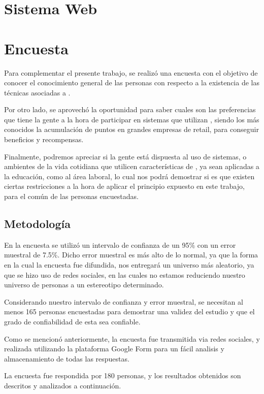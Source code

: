 \section{Sistema Web}


\section{Encuesta}

Para complementar el presente trabajo, se realizó una encuesta con el objetivo de
conocer el conocimiento general de las personas con respecto a la existencia
de las técnicas asociadas a {\GAM}.

Por otro lado, se aprovechó la oportunidad para saber cuales son las preferencias
que tiene la gente a la hora de participar en sistemas que utilizan {\GAM},
siendo los más conocidos la acumulación de puntos en grandes empresas de retail,
para conseguir beneficios y recompensas.

Finalmente, podremos apreciar si la gente está dispuesta al uso de sistemas,
o ambientes de la vida cotidiana que utilicen características de {\GAM},
ya sean aplicadas a la educación, como al área laboral, lo cual nos podrá
demostrar si es que existen ciertas restricciones a la hora de aplicar
el principio expuesto en este trabajo, para el común de las personas
encuestadas.

\subsection{Metodología}

En la encuesta se utilizó un intervalo de confianza de un 95\% con un error
muestral de 7.5\%. Dicho error muestral es más alto de lo normal, ya que la forma
en la cual la encuesta fue difundida, nos entregará un universo más aleatorio,
 ya que se hizo uso de redes sociales, en las cuales no estamos reduciendo nuestro
 universo de personas a un estereotipo determinado.

Considerando nuestro intervalo de confianza y error muestral, se necesitan al menos 165
personas encuestadas para demostrar una validez del estudio y que el grado de confiabilidad
de esta sea confiable.

Como se mencionó anteriormente, la encuesta fue transmitida via redes sociales,
y realizada utilizando la plataforma Google Form para un fácil analisis y almacenamiento
 de todas las respuestas.

La encuesta fue respondida por 180 personas, y los resultados obtenidos son descritos y
analizados a continuación.

